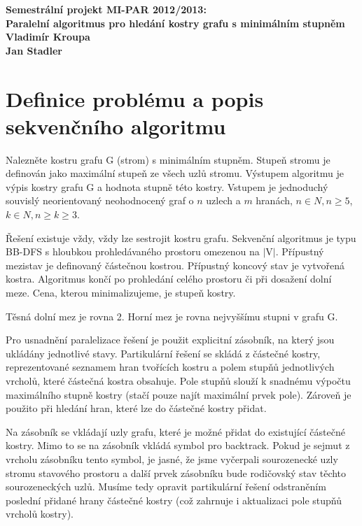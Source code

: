 \documentclass[12pt]{article}
\begin{document}

\begin{center}
\bf Semestrální projekt MI-PAR 2012/2013:\\[5mm]
    Paralelní algoritmus pro hledání kostry grafu s minimálním stupněm\\[5mm]
       Vladimír Kroupa\\
       Jan Stadler\\[2mm]
\end{center}

\section{Definice problému a popis sekvenčního algoritmu}

Nalezněte kostru grafu G (strom) s minimálním stupněm. Stupeň stromu je definován jako maximální stupeň ze všech uzlů stromu. Výstupem algoritmu je výpis kostry grafu G a hodnota stupně této kostry. Vstupem je  jednoduchý souvislý neorientovaný neohodnocený graf o $n$ uzlech a $m$ hranách, $n \in N, n \ge 5$, $k \in N, n \ge k \ge 3 $.

Řešení existuje vždy, vždy lze sestrojit kostru grafu. Sekvenční algoritmus je typu BB-DFS s hloubkou prohledávaného prostoru omezenou na $\vert$V$\vert$. Přípustný mezistav je definovaný částečnou kostrou. Přípustný koncový stav je vytvořená kostra. Algoritmus končí po prohledání celého prostoru či při dosažení dolní meze. Cena, kterou minimalizujeme, je stupeň kostry.

Těsná dolní mez je rovna 2. Horní mez je rovna nejvyššímu stupni v grafu G.

Pro usnadnění paralelizace řešení je použit explicitní zásobník, na který jsou ukládány jednotlivé stavy. Partikulární řešení se skládá z částečné kostry, reprezentované seznamem hran tvořících kostru a polem stupňů jednotlivých vrcholů, které částečná kostra obsahuje. Pole stupňů slouží k snadnému výpočtu maximálního stupně kostry (stačí pouze najít maximální prvek pole). Zároveň je použito při hledání hran, které lze do částečné kostry přidat. 

Na zásobník se vkládají uzly grafu, které je možné přidat do existující částečné kostry. Mimo to se na zásobník vkládá symbol pro backtrack. Pokud je sejmut z vrcholu zásobníku tento symbol, je jasné, že jsme vyčerpali sourozenecké uzly stromu stavového prostoru a další prvek zásobníku bude rodičovský stav těchto sourozeneckých uzlů. Musíme tedy opravit partikulární řešení odstraněním poslední přidané hrany částečné kostry (což zahrnuje i aktualizaci pole stupňů vrcholů kostry).
\end{document}
